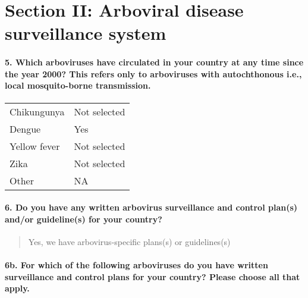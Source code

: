 \documentclass[
]{article}
\begin{document}
\hypertarget{section-ii-arboviral-disease-surveillance-system}{%
\section{Section II: Arboviral disease surveillance
system}\label{section-ii-arboviral-disease-surveillance-system}}

\hypertarget{which-arboviruses-have-circulated-in-your-country-at-any-time-since-the-year-2000-this-refers-only-to-arboviruses-with-autochthonous-i.e.-local-mosquito-borne-transmission.}{%
\paragraph{5. Which arboviruses have circulated in your country at any
time since the year 2000? This refers only to arboviruses with
autochthonous i.e., local mosquito-borne
transmission.}\label{which-arboviruses-have-circulated-in-your-country-at-any-time-since-the-year-2000-this-refers-only-to-arboviruses-with-autochthonous-i.e.-local-mosquito-borne-transmission.}}

\begin{longtable}[]{@{}ll@{}}
\toprule
\endhead
Chikungunya & Not selected \\
Dengue & Yes \\
Yellow fever & Not selected \\
Zika & Not selected \\
Other & NA \\
\bottomrule
\end{longtable}

\hypertarget{do-you-have-any-written-arbovirus-surveillance-and-control-plans-andor-guidelines-for-your-country}{%
\paragraph{6. Do you have any written arbovirus surveillance and control
plan(s) and/or guideline(s) for your
country?}\label{do-you-have-any-written-arbovirus-surveillance-and-control-plans-andor-guidelines-for-your-country}}

\begin{quote}
Yes, we have arbovirus-specific plans(s) or guidelines(s)
\end{quote}

\hypertarget{b.-for-which-of-the-following-arboviruses-do-you-have-written-surveillance-and-control-plans-for-your-country-please-choose-all-that-apply.}{%
\paragraph{6b. For which of the following arboviruses do you have
written surveillance and control plans for your country? Please choose
all that
apply.}\label{b.-for-which-of-the-following-arboviruses-do-you-have-written-surveillance-and-control-plans-for-your-country-please-choose-all-that-apply.}}
\end{document}
